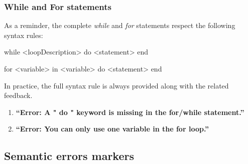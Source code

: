 \documentclass[11pt,a4paper,twoside,openright]{report}
\begin{document}
\subsubsection{While and For statements}

As a reminder, the complete \textit{while} and \textit{for} statements respect 
the following syntax rules:

\begin{OZ}
  while <loopDescription> do
    <statement>
  end
\end{OZ}

\begin{OZ}
  for <variable> in <variable> do
    <statement>
  end
\end{OZ}

In practice, the full syntax rule is always provided along with the related 
feedback.

\begin{enumerate}
\item \textbf{\enquote{Error: A " do " keyword is missing in the for/while 
statement.}}


\item \textbf{\enquote{Error: You can only use one variable in the for loop.}}
\end{enumerate}

\subsection{Semantic errors markers}
\end{document}

